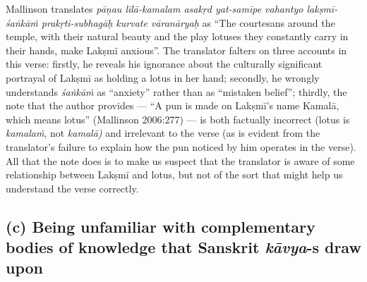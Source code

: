 Mallinson translates \textsl{pāṇau līlā-kamalam asakṛd yat-samīpe vahantyo lakṣmī-śaṅkāṁ prakṛti-subhagāḥ kurvate vāranāryaḥ} as “The courtesans around the temple, with their natural beauty and the play lotuses they constantly carry in their hands, make Lakṣmī anxious”. The translator falters on three accounts in this verse: firstly, he reveals his ignorance about the culturally significant portrayal of Lakṣmī as holding a lotus in her hand; secondly, he wrongly understands \textsl{śaṅkāṁ}  as “anxiety” rather than as “mistaken belief”; thirdly, the note that the author provides --- “A pun is made on Lakṣmī’s name Kamalā, which means lotus” (Mallinson 2006:277) --- is both factually incorrect (lotus is \textsl{kamalaṁ}, not \textsl{kamalā)}  and irrelevant to the verse (as is evident from the translator’s failure to explain how the pun noticed by him operates in the verse). All that the note does is to make us suspect that the translator is aware of some relationship between Lakṣmī and lotus, but not of the sort that might help us understand the verse correctly.

\subsection*{(c) Being unfamiliar with complementary bodies of knowledge that Sanskrit \textsl{kāvya}-s draw upon}


